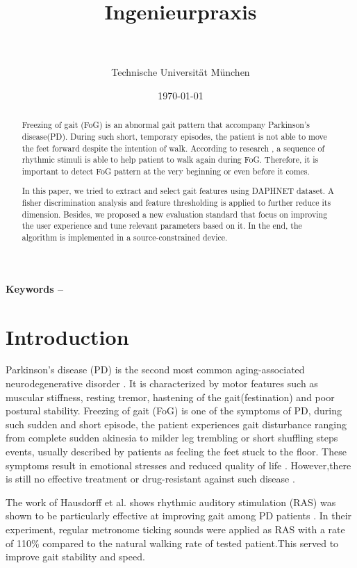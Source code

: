 \documentclass[article]{article}
\title{Ingenieurpraxis\\\mytitle}
\author{\myauthor\hspace{1em}\\\contact\\Technische Universität München}
\date{\today}
\begin{document}
\maketitle

\begin{abstract}
    Freezing of gait (FoG) is an abnormal gait pattern that accompany Parkinson's disease(PD). During such short, temporary episodes, the patient is not able to move the feet forward despite the intention of walk. According to research \cite{RAS}, a sequence of rhythmic stimuli is able to help patient to walk again during FoG. Therefore, it is important to detect FoG pattern at the very beginning or even before it comes.
    
    In this paper, we tried to extract and select gait features using DAPHNET dataset. A fisher discrimination analysis and feature thresholding is applied to further reduce its dimension. Besides, we proposed a new evaluation standard that focus on improving the user experience and tune relevant parameters based on it. In the end, the algorithm is implemented in a source-constrained device.
    
\end{abstract}  
\textbf{Keywords -- }{\mykeywords}

\section{Introduction}
    Parkinson's disease (PD) is the second most common aging-associated neurodegenerative disorder \cite{PD}. It is characterized by motor features such as muscular stiffness, resting tremor, hastening of the gait(festination) and poor postural stability. Freezing of gait (FoG) is one of the symptoms of PD, during such sudden and short episode, the patient experiences gait disturbance ranging from complete sudden akinesia to milder leg trembling or short shuffling steps events, usually described by patients as feeling the feet stuck to the floor. These symptoms result in emotional stresses and reduced quality of life \cite{PD1}. However,there is still no effective treatment or drug-resistant against such disease \cite{medicin}.
    
    The work of Hausdorff et al. shows rhythmic auditory stimulation (RAS) was shown to be particularly effective at improving gait among PD patients \cite{RAS1}. In their experiment, regular metronome ticking sounds were applied as RAS with a rate of 110\% compared to the natural walking rate of tested patient.This served to improve gait stability and speed.
 	
\end{document}
